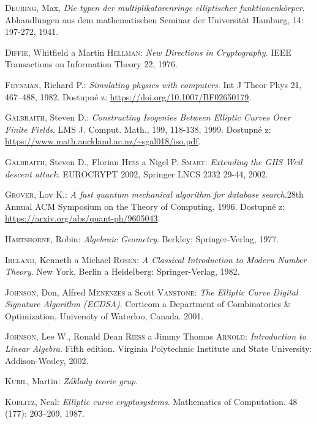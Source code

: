 \documentclass [12pt]{report}
\begin{document}
\begin{thebibliography}{97}
\textsc{Deuring}, Max, \textit{Die typen der multiplikatorenringe elliptischer funktionenkörper}. Abhandlungen aus dem mathematischen Seminar der Universität Hamburg, 14: 197-272, 1941. 

\textsc{Diffie}, Whitfield a Martin \textsc{Hellman}: \textit{New Directions in Cryptography}. IEEE Transactions on Information Theory 22, 1976.

\textsc{Feynman}, Richard P.: \textit{Simulating physics with computers}. Int J Theor Phys 21, 467–488, 1982. Dostupné z: \url{https://doi.org/10.1007/BF02650179}.

\textsc{Galbraith}, Steven D.: \textit{Constructing Isogenies Between Elliptic Curves Over Finite Fields}. LMS J. Comput. Math., 199, 118-138, 1999. Dostupné z: \url{https://www.math.auckland.ac.nz/~sgal018/iso.pdf}.

\textsc{Galbraith}, Steven D., Florian \textsc{Hess} a Nigel P. \textsc{Smart}: \textit{Extending the GHS Weil descent attack.} EUROCRYPT 2002,  Springer LNCS 2332 29-44, 2002.


\textsc{Grover}, Lov K.: \textit{A fast quantum mechanical algorithm for database search}.28th Annual ACM Symposium on the Theory of Computing, 1996. Dostupné z: \url{https://arxiv.org/abs/quant-ph/9605043}.

\textsc{Hartshorne}, Robin: \textit{Algebraic  Geometry}. Berkley: Springer-Verlag, 1977.

\textsc{Ireland}, Kenneth a Michael \textsc{Rosen}: \textit{A Classical Introduction to Modern Number Theory}. New York, Berlin a Heidelberg: Springer-Verlag, 1982.

\textsc{Johnson}, Don, Alfred \textsc{Menenzes} a Scott \textsc{Vanstone}: \textit{The Elliptic Curve Digital Signature Algorithm (ECDSA)}. Certicom a Department of Combinatorics \& Optimization, University of Waterloo, Canada. 2001.

\textsc{Johnson}, Lee W., Ronald Dean \textsc{Riess} a Jimmy Thomas \textsc{Arnold}: \textit{Introduction to Linear Algebra}. Fifth edition. Virginia Polytechnic Institute and State University: Addison-Wesley, 2002.

\textsc{Kuřil}, Martin: \textit{Základy teorie grup}.

\textsc{Koblitz}, Neal: \textit{Elliptic curve cryptosystems}. Mathematics of Computation. 48 (177): 203–209, 1987.


\end{thebibliography}
\end{document}
